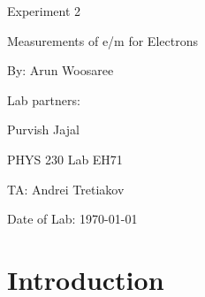 \documentclass[letterpaper]{article}
\begin{document}
  \begin{titlepage}
    \begin{center}
        \vspace*{1cm}
        \Huge
        Experiment 2
        \vspace{1cm}

        Measurements of e/m for Electrons
        \vspace{1cm}

        By: Arun Woosaree
        \vspace{1cm}

        Lab partners:
        \vspace{.25cm}
        \Large

        Purvish Jajal


        \Huge
        PHYS 230 Lab EH71
        \vspace{1cm}

        TA: Andrei Tretiakov
        \vspace{1cm}

        Date of Lab: \today
        \vfill
    \end{center}
\end{titlepage}

\section{Introduction}
\end{document}
